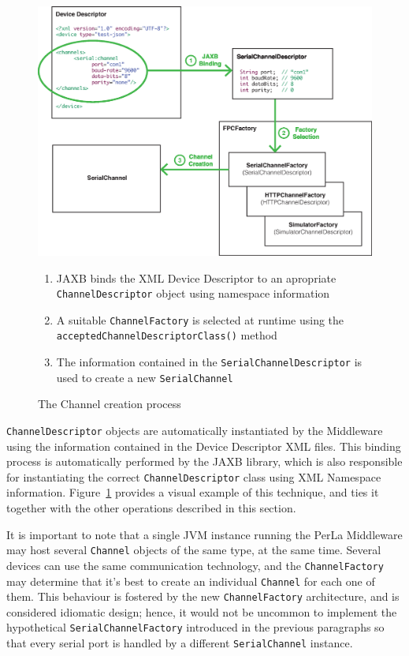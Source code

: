 \begin{figure}[h!]
\includegraphics[width=\textwidth]{imgs/channel_creation_process.eps}
\caption{The Channel creation process}
\label{fig:channel.creation}
{
\begin{footnotesize}
\begin{enumerate}
  \item JAXB binds the XML Device Descriptor to an apropriate \texttt{ChannelDescriptor} object using namespace information
  \item A suitable \texttt{ChannelFactory} is selected at runtime using the \texttt{acceptedChannelDescriptorClass()} method
  \item The information contained in the \texttt{SerialChannelDescriptor} is used to create a new \texttt{SerialChannel}
\end{enumerate}
\end{footnotesize}
}
\end{figure}

\texttt{ChannelDescriptor} objects are automatically instantiated by the Middleware using the information contained in the Device Descriptor XML files. This binding process is automatically performed by the JAXB library, which is also responsible for instantiating the correct \texttt{ChannelDescriptor} class using XML Namespace information. Figure~\ref{fig:channel.creation} provides a visual example of this technique, and ties it together with the other operations described in this section.

It is important to note that a single JVM instance running the PerLa Middleware may host several \texttt{Channel} objects of the same type, at the same time. Several devices can use the same communication technology, and the \texttt{ChannelFactory} may determine that it's best to create an individual \texttt{Channel} for each one of them. This behaviour is fostered by the new \texttt{ChannelFactory} architecture, and is considered idiomatic design; hence, it would not be uncommon to implement the hypothetical \texttt{SerialChannelFactory} introduced in the previous paragraphs so that every serial port is handled by a different \texttt{SerialChannel} instance.


